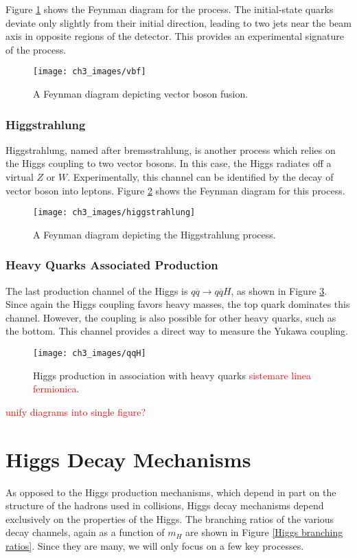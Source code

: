 \documentclass[10pt,a4paper]{book}
\newcommand\todo[1]{\textcolor{red}{#1}}
\begin{document}
Figure \ref{VBF} shows the Feynman diagram for the process. The initial-state quarks deviate only slightly from their initial direction, leading to two jets near the beam axis in opposite regions of the detector. This provides an experimental signature of the process. 

\begin{figure}[h!]
\centering
\texttt{[image: ch3\_images/vbf]}
\caption{A Feynman diagram depicting vector boson fusion.}
\label{VBF}
\end{figure}

\subsubsection{Higgstrahlung}
Higgstrahlung, named after bremsstrahlung, is another process which relies on the Higgs coupling to two vector bosons. In this case, the Higgs radiates off a virtual $Z$ or $W$. Experimentally, this channel can be identified by the decay of vector boson into leptons. Figure \ref{higgstrahlung} shows the Feynman diagram for this process.

\begin{figure}[h!]
\centering
\texttt{[image: ch3\_images/higgstrahlung]}
\caption{A Feynman diagram depicting the Higgstrahlung process.}
\label{higgstrahlung}
\end{figure}

\subsubsection{Heavy Quarks Associated Production}
The last production channel of the Higgs is $q\overline{q}\rightarrow q\overline{q}H$, as shown in Figure \ref{heavy quark production}. Since again the Higgs coupling favors heavy masses, the top quark dominates this channel. However, the coupling is also possible for other heavy quarks, such as the bottom. This channel provides a direct way to measure the Yukawa coupling.
\begin{figure}
\centering
\texttt{[image: ch3\_images/qqH]}
\caption{Higgs production in association with heavy quarks \todo{sistemare linea fermionica}.}
\label{heavy quark production}
\end{figure}

\todo{unify diagrams into single figure?}
\section{Higgs Decay Mechanisms}
As opposed to the Higgs production mechanisms, which depend in part on the structure of the hadrons used in collisions, Higgs decay mechanisms depend exclusively on the properties of the Higgs. The branching ratios of the various decay channels, again as a function of $m_H$ are shown in Figure \ref{Higgs branching ratios}. Since they are many, we will only focus on a few key processes.
\end{document}
